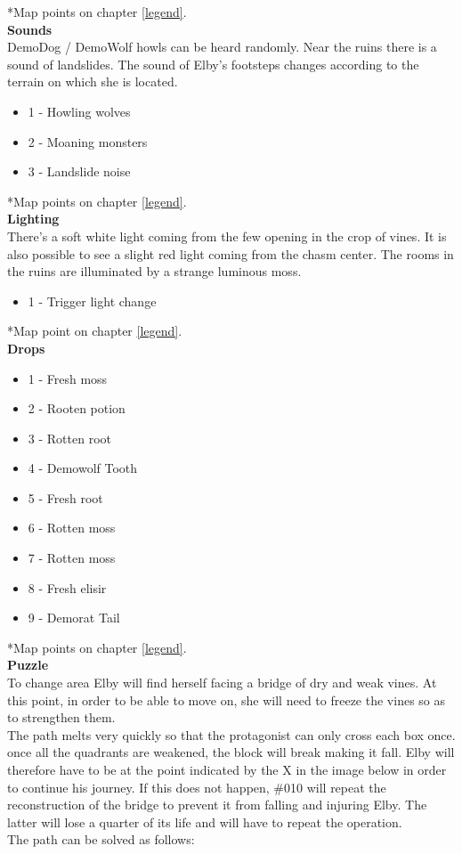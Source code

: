 *Map points on chapter \ref{legend}.\\

\textbf{Sounds}\\
DemoDog / DemoWolf howls can be heard randomly. Near the ruins there is a sound of landslides. The sound of Elby's footsteps changes according to the terrain on which she is located.

\begin{itemize}
	\item 1 - Howling wolves
	\item 2 - Moaning monsters
	\item 3 - Landslide noise
\end{itemize}

*Map points on chapter \ref{legend}.\\

\textbf{Lighting}\\
There's a soft white light coming from the few opening in the crop of vines. It is also possible to see a slight red light coming from the chasm center. The rooms in the ruins are illuminated by a strange luminous moss.

\begin{itemize}
	\item 1 - Trigger light change
\end{itemize}

*Map point on chapter \ref{legend}.\\

\textbf{Drops}
\begin{itemize}
	\item 1 - Fresh moss
	\item 2 - Rooten potion
	\item 3 - Rotten root
	\item 4 - Demowolf Tooth
	\item 5 - Fresh root
	\item 6 - Rotten moss
	\item 7 - Rotten moss
	\item 8 - Fresh elisir
	\item 9 - Demorat Tail
\end{itemize}

*Map points on chapter \ref{legend}.\\

\textbf{Puzzle}\\
To change area Elby will find herself facing a bridge of dry and weak vines. At this point, in order to be able to move on, she will need to freeze the vines so as to strengthen them.\\
The path melts very quickly so that the protagonist can only cross each box once. once all the quadrants are weakened, the block will break making it fall. Elby will therefore have to be at the point indicated by the X in the image below in order to continue his journey. If this does not happen, \#010 will repeat the reconstruction of the bridge to prevent it from falling and injuring Elby. The latter will lose a quarter of its life and will have to repeat the operation.\\
The path can be solved as follows:\\

